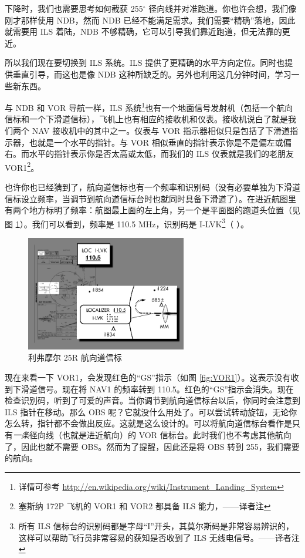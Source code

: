 下降时，我们也需要思考如何截获 255$^\circ$ 径向线并对准跑道。你也许会想，我们像刚才那样使用 NDB，然而 NDB 已经不能满足需求。我们需要“精确”落地，因此就需要用 ILS 着陆，NDB 不够精确，它可以引导我们靠近跑道，但无法靠的更近。

所以我们现在要切换到 ILS 系统。ILS 提供了更精确的水平方向定位。同时也提供垂直引导，而这也是像 NDB 这种所缺乏的。另外也利用这几分钟时间，学习一些新东西。

与 NDB 和 VOR 导航一样，ILS 系统\footnote{详情可参考 \url{http://en.wikipedia.org/wiki/Instrument_Landing_System}}也有一个地面信号发射机（包括一个航向信标和一个下滑道信标），飞机上也有相应的接收机和仪表。接收机说白了就是我们两个 NAV 接收机中的其中之一。仪表与 VOR 指示器相似只是包括了下滑道指示器，也就是一个水平的指针。与 VOR 相似垂直的指针表示你是不是偏左或偏右。而水平的指针表示你是否太高或太低，而我们的 ILS 仪表就是我们的老朋友 VOR1\footnote{塞斯纳 172P 飞机的 VOR1 和 VOR2 都具备 ILS 能力，——译者注}。

也许你也已经猜到了，航向道信标也有一个频率和识别码（没有必要单独为下滑道信标设立频率，当调节到航向道信标台时也就同时具备下滑道了）。在进近航图里有两个地方标明了频率：航图最上面的左上角，另一个是平面图的跑道头位置（见图 \ref{fig:localizer}）。我们可以看到，频率是 110.5 MHz，识别码是 I-LVK\footnote{所有 ILS 信标台的识别码都是字母“I”开头，其莫尔斯码是非常容易辨识的\mspace\mdot\mdot\mspace，这样可以帮助飞行员非常容易的获知是否收到了 ILS 无线电信号。——译者注}（\mdot\mdot\mspace \mdot\mdash\mdot\mdot\mspace
\mdot\mdot\mdot\mdash\mspace \mdash\mdot\mdash）。

\begin{figure}
  \begin{center}
    \includegraphics[width=7cm]{img/localizer}
    \caption{利弗摩尔 25R 航向道信标}
    \label{fig:localizer}
  \end{center}
\end{figure}

现在来看一下 VOR1，会发现红色的“GS”指示（如图 \ref{fig:VOR1}）。这表示没有收到下滑道信号。现在将 NAV1 的频率转到 110.5。红色的“GS”指示会消失。现在检查识别码，听到了可爱的声音。当你调节到航向道信标台以后，你同时会注意到 ILS 指针在移动。那么 OBS 呢？它就没什么用处了。可以尝试转动旋钮，无论你怎么转，指针都不会做出反应。这就是这么设计的。可以将航向道信标台看作是只有\emph{一条}径向线（也就是进近航向）的 VOR 信标台。此时我们也不考虑其他航向了，因此也就不需要 OBS。然而为了提醒，因此还是将 OBS 转到 255，我们需要的航向。


